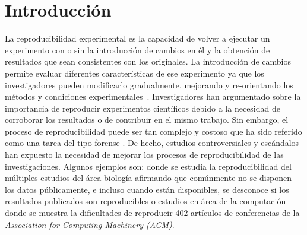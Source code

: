 \chapter{Introducción}
\label{Chapter1} 
\newcommand{\keyword}[1]{\textbf{#1}}
\newcommand{\tabhead}[1]{\textbf{#1}}
\newcommand{\code}[1]{\texttt{#1}}
\newcommand{\file}[1]{\texttt{\bfseries#1}}
\newcommand{\option}[1]{\texttt{\itshape#1}}
La reproducibilidad experimental es la capacidad de volver a ejecutar un experimento con o sin la introducción de cambios en él y la obtención de resultados que sean consistentes con los originales.
La introducción de cambios permite evaluar diferentes características de ese experimento ya que los investigadores pueden modificarlo gradualmente, mejorando y re-orientando los métodos y condiciones experimentales~\cite{stodden2010reproducible}.
Investigadores han argumentado sobre la importancia de reproducir experimentos científicos debido a la necesidad de corroborar los resultados o de contribuir en el mismo trabajo.
Sin embargo, el proceso de reproducibilidad puede ser tan complejo y costoso que ha sido referido como una tarea del tipo forense \cite{baggerly2009deriving}.
De hecho, estudios controversiales y escándalos han expuesto la necesidad de mejorar los procesos de reproducibilidad de las investigaciones. 
Algunos ejemplos son: \cite{ioannidis2009repeatability} donde se estudia la reproducibilidad del múltiples estudios del área biología afirmando que comúnmente no se disponen los datos públicamente, e incluso cuando están disponibles, se desconoce si los resultados publicados son reproducibles o estudios en área de la computación donde se muestra la dificultades de reproducir 402 artículos de conferencias de la \emph{Association for Computing Machinery (ACM)}\cite{collberg2015repeatability}.

